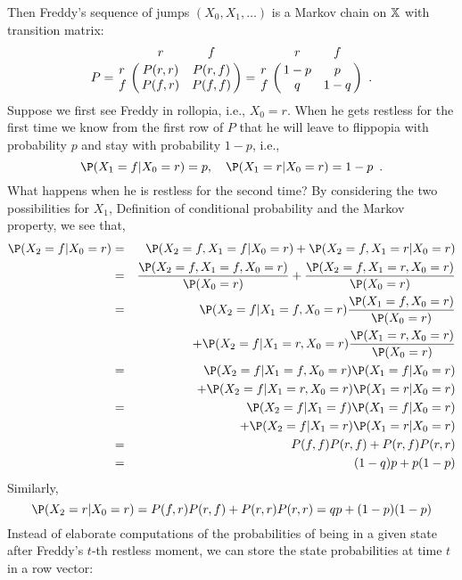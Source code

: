 \begin{example}
Then Freddy's sequence of jumps $(X_0, X_1,\ldots)$ is a Markov chain on $\mathbb{X}$ with transition matrix:
\begin{equation}\label{E:FlippantFreddyP}
P 
= \bordermatrix{~ & r & f \cr 
r & P(r,r) & P(r,f)\cr 
f & P(f,r) & P(f,f) }
= \bordermatrix{~ & r & f \cr 
r & 1-p & p \cr
f & q & 1-q } \enspace .
\end{equation}
Suppose we first see Freddy in rollopia, i.e., $X_0=r$.  When he gets restless for the first time we know from the first row of $P$ that he will leave to flippopia with probability $p$ and stay with probability $1-p$, i.e.,
\begin{equation}\label{E:Freddy1Step}
\P(X_1=f | X_0=r) = p, \quad \P(X_1=r | X_0=r) = 1-p \enspace .
\end{equation}
What happens when he is restless for the second time?  By considering the two possibilities for $X_1$, Definition of conditional probability and the Markov property, we see that,
\begin{eqnarray}
\P(X_2 = f | X_0 = r) 
&=& \P(X_2=f, X_1=f | X_0=r) + \P(X_2=f, X_1=r | X_0=r) \notag \\
&=& \frac{\P(X_2=f, X_1=f , X_0=r)}{\P(X_0=r)} + \frac{\P(X_2=f, X_1=r , X_0=r)}{\P(X_0=r)} \notag \\
&=& \P(X_2=f | X_1=f , X_0=r)\frac{\P(X_1=f , X_0=r)}{\P(X_0=r)} \notag \\
&& \qquad + \P(X_2=f | X_1=r , X_0=r) \frac{\P(X_1=r , X_0=r)}{\P(X_0=r)} \notag \\
&=&{\P(X_2=f | X_1=f , X_0=r)\P(X_1=f | X_0=r)} \notag \\
&& \qquad +{\P(X_2=f | X_1=r , X_0=r) \P(X_1=r | X_0=r)} \notag \\
&=& \P(X_2=f | X_1=f) \P(X_1=f | X_0=r) \notag \\
&& \qquad+ \P(X_2=f | X_1=r) \P(X_1=r | X_0=r) \notag \\
&=& P(f,f) P(r,f) + P(r,f) P(r,r) \notag \\
&=& (1-q) p + p (1-p) \label{E:Freddy2Stepa}
\end{eqnarray}
Similarly, 
\begin{equation} \label{E:Freddy2Stepb}
\P(X_2=r | X_0 =r) = P(f,r) P(r,f) + P(r,r) P(r,r) = q p + (1-p)(1-p)
\end{equation}
Instead of elaborate computations of the probabilities of being in a given state after Freddy's $t$-th restless moment, we can store the state probabilities at time $t$ in a row vector:

\end{example}
